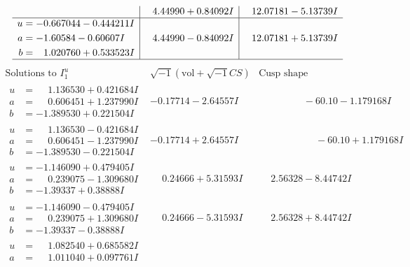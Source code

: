 \documentclass[1p]{elsarticle_modified}
\theoremstyle{definition}
\newcommand{\I}{\sqrt{-1}}
\begin{document}
$$\begin{array}{c|c|c}
 & \phantom{-}4.44990 + 0.84092 I & \phantom{-}12.07181 - 5.13739 I \\ \hline\begin{aligned}
u &= -0.667044 - 0.444211 I \\
a &= -1.60584 - 0.60607 I \\
b &= \phantom{-}1.020760 + 0.533523 I\end{aligned}
 & \phantom{-}4.44990 - 0.84092 I & \phantom{-}12.07181 + 5.13739 I\\
 \hline 
 \end{array}$$\newpage$$\begin{array}{c|c|c}  
\text{Solutions to }I^u_{1}& \I (\text{vol} + \sqrt{-1}CS) & \text{Cusp shape}\\
 \hline 
\begin{aligned}
u &= \phantom{-}1.136530 + 0.421684 I \\
a &= \phantom{-}0.606451 + 1.237990 I \\
b &= -1.389530 + 0.221504 I\end{aligned}
 & -0.17714 - 2.64557 I & \phantom{-0.000000 }      -6
0. 10   - 1.179168 I \\ \hline\begin{aligned}
u &= \phantom{-}1.136530 - 0.421684 I \\
a &= \phantom{-}0.606451 - 1.237990 I \\
b &= -1.389530 - 0.221504 I\end{aligned}
 & -0.17714 + 2.64557 I & \phantom{-0.000000 -}     -6
0. 10   + 1.179168 I \\ \hline\begin{aligned}
u &= -1.146090 + 0.479405 I \\
a &= \phantom{-}0.239075 - 1.309680 I \\
b &= -1.39337 + 0.38888 I\end{aligned}
 & \phantom{-}0.24666 + 5.31593 I & \phantom{-}2.56328 - 8.44742 I \\ \hline\begin{aligned}
u &= -1.146090 - 0.479405 I \\
a &= \phantom{-}0.239075 + 1.309680 I \\
b &= -1.39337 - 0.38888 I\end{aligned}
 & \phantom{-}0.24666 - 5.31593 I & \phantom{-}2.56328 + 8.44742 I \\ \hline\begin{aligned}
u &= \phantom{-}1.082540 + 0.685582 I \\
a &= \phantom{-}1.011040 + 0.097761 I \\

\end{aligned}
\end{array}$$
\end{document}
